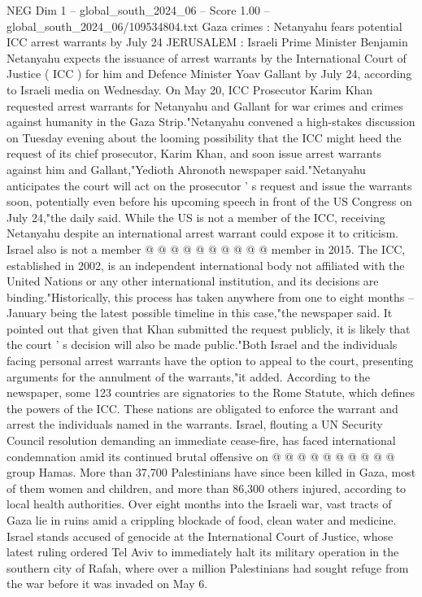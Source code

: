 \begin{textsample}{NEG Dim 1 – global\_south\_2024\_06 – Score 1.00 – global\_south\_2024\_06/109534804.txt}  \label{ex:f1_neg_322}
Gaza crimes : Netanyahu fears potential ICC arrest warrants by July 24 JERUSALEM : Israeli Prime Minister Benjamin Netanyahu expects the issuance of arrest warrants by the International Court of Justice ( ICC ) for him and Defence Minister Yoav Gallant by July 24, according to Israeli media on Wednesday.
On May 20, ICC Prosecutor Karim Khan requested arrest warrants for Netanyahu and Gallant for war crimes and crimes against humanity in the Gaza Strip."Netanyahu convened a high-stakes discussion on Tuesday evening about the looming possibility that the ICC might heed the request of its chief prosecutor, Karim Khan, and soon issue arrest warrants against him and Gallant,"Yedioth Ahronoth newspaper said."Netanyahu anticipates the court will act on the prosecutor ' s request and issue the warrants soon, potentially even before his upcoming speech in front of the US Congress on July 24,"the daily said.
While the US is not a member of the ICC, receiving Netanyahu despite an international arrest warrant could expose it to criticism.
Israel also is not a member @ @ @ @ @ @ @ @ @ @ member in 2015.
The ICC, established in 2002, is an independent international body not affiliated with the United Nations or any other international institution, and its decisions are binding."Historically, this process has taken anywhere from one to eight months -- January being the latest possible timeline in this case,"the newspaper said.
It pointed out that given that Khan submitted the request publicly, it is likely that the court ' s decision will also be made public."Both Israel and the individuals facing personal arrest warrants have the option to appeal to the court, presenting arguments for the annulment of the warrants,"it added.
According to the newspaper, some 123 countries are signatories to the Rome Statute, which defines the powers of the ICC.
These nations are obligated to enforce the warrant and arrest the individuals named in the warrants.
Israel, flouting a UN Security Council resolution demanding an immediate cease-fire, has faced international condemnation amid its continued brutal offensive on @ @ @ @ @ @ @ @ @ @ group Hamas.
More than 37,700 Palestinians have since been killed in Gaza, most of them women and children, and more than 86,300 others injured, according to local health authorities.
Over eight months into the Israeli war, vast tracts of Gaza lie in ruins amid a crippling blockade of food, clean water and medicine.
Israel stands accused of genocide at the International Court of Justice, whose latest ruling ordered Tel Aviv to immediately halt its military operation in the southern city of Rafah, where over a million Palestinians had sought refuge from the war before it was invaded on May 6.

\end{textsample}
